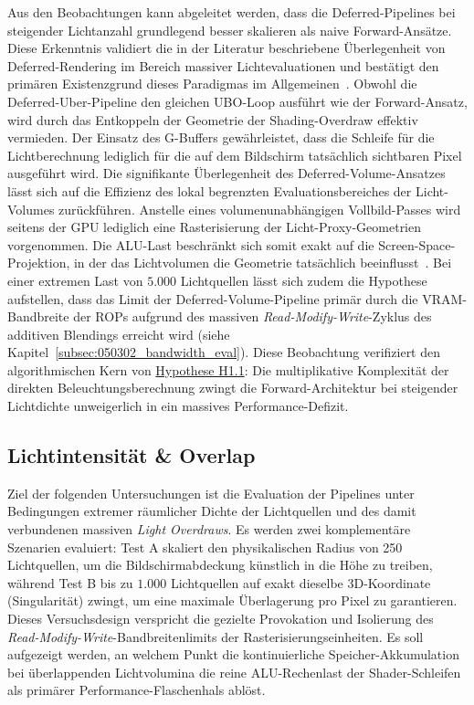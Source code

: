 Aus den Beobachtungen kann abgeleitet werden, dass die Deferred-Pipelines bei steigender Lichtanzahl grundlegend besser
skalieren als naive Forward-Ansätze.
Diese Erkenntnis validiert die in der Literatur beschriebene Überlegenheit von Deferred-Rendering im Bereich massiver
Lichtevaluationen und bestätigt den primären Existenzgrund dieses Paradigmas im
Allgemeinen~\cites[S.~1]{Thaler2011DeferredRendering}.
Obwohl die Deferred-Uber-Pipeline den gleichen \ac{UBO}-Loop ausführt wie der Forward-Ansatz, wird durch das
Entkoppeln der Geometrie der Shading-Overdraw effektiv vermieden.
Der Einsatz des \ac{G-Buffer}s gewährleistet, dass die Schleife für die Lichtberechnung lediglich für die auf dem
Bildschirm tatsächlich sichtbaren Pixel ausgeführt wird.
Die signifikante Überlegenheit des Deferred-Volume-Ansatzes lässt sich auf die Effizienz des lokal begrenzten
Evaluationsbereiches der Licht-Volumes zurückführen.
Anstelle eines volumenunabhängigen Vollbild-Passes wird seitens der \ac{GPU} lediglich eine Rasterisierung der
Licht-Proxy-Geometrien vorgenommen.
Die \ac{ALU}-Last beschränkt sich somit exakt auf die Screen-Space-Projektion, in der das Lichtvolumen die Geometrie
tatsächlich beeinflusst~\cite[S.~886]{akenine-mollerRealtimeRendering2019}.
Bei einer extremen Last von $5.000$ Lichtquellen lässt sich zudem die Hypothese aufstellen, dass das Limit der
Deferred-Volume-Pipeline primär durch die \ac{VRAM}-Bandbreite der \ac{ROP}s aufgrund des massiven
\textit{Read-Modify-Write}-Zyklus des additiven Blendings erreicht wird
(siehe Kapitel~\ref{subsec:050302_bandwidth_eval}).
Diese Beobachtung verifiziert den algorithmischen Kern von \hyperlink{hyp:H1.1}{Hypothese H1.1}: Die multiplikative
Komplexität der direkten Beleuchtungsberechnung zwingt die Forward-Architektur bei steigender Lichtdichte unweigerlich
in ein massives Performance-Defizit.

\subsection{{Lichtintensität \& Overlap}}
\label{subsec:050402_light_intensity_and_overlap_eval}

Ziel der folgenden Untersuchungen ist die Evaluation der Pipelines unter Bedingungen extremer räumlicher Dichte der
Lichtquellen und des damit verbundenen massiven \textit{Light Overdraws}.
Es werden zwei komplementäre Szenarien evaluiert: Test A skaliert den physikalischen Radius von 250 Lichtquellen, um die
Bildschirmabdeckung künstlich in die Höhe zu treiben, während Test B bis zu $1.000$ Lichtquellen auf exakt dieselbe
3D-Koordinate (Singularität) zwingt, um eine maximale Überlagerung pro Pixel zu garantieren.
Dieses Versuchsdesign verspricht die gezielte Provokation und Isolierung des
\textit{Read-Modify-Write}-Bandbreitenlimits der Rasterisierungseinheiten.
Es soll aufgezeigt werden, an welchem Punkt die kontinuierliche Speicher-Akkumulation bei überlappenden Lichtvolumina
die reine \ac{ALU}-Rechenlast der Shader-Schleifen als primärer Performance-Flaschenhals ablöst.

